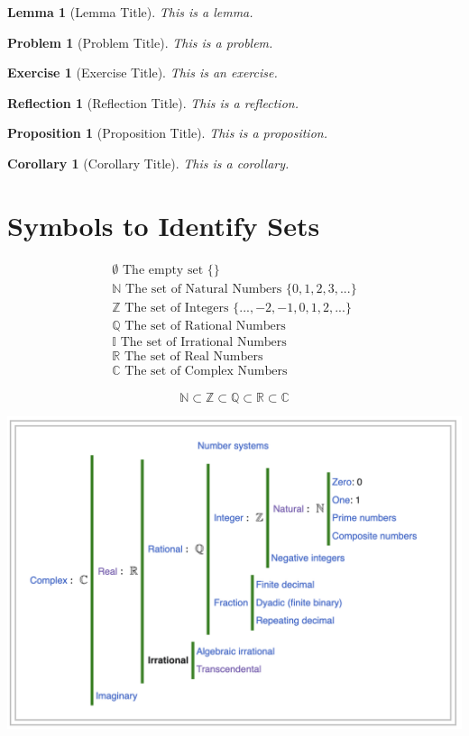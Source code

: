 \documentclass[12pt]{article}
\newtheorem{lemma}{Lemma}
\newtheorem{problem}{Problem}
\newtheorem{exercise}{Exercise}
\newtheorem{reflection}{Reflection}
\newtheorem{proposition}{Proposition}
\newtheorem{corollary}{Corollary}
\newcommand{\N}{\mathbb{N}}
\newcommand{\Z}{\mathbb{Z}}
\newcommand{\R}{\mathbb{R}}
\newcommand{\Q}{\mathbb{Q}}
\newcommand{\C}{\mathbb{C}}
\newcommand{\I}{\mathbb{I}}
\begin{document}
\begin{lemma}[Lemma Title]
	This is a lemma.
\end{lemma}

\begin{problem}[Problem Title]
This is a problem.
\end{problem}

\begin{exercise}[Exercise Title]
	This is an exercise.
\end{exercise}

\begin{reflection}[Reflection Title]
	This is a reflection.
\end{reflection}

\begin{proposition}[Proposition Title]
	This is a proposition.
\end{proposition}

\begin{corollary}[Corollary Title]
	This is a corollary.
\end{corollary}

\newpage
\section{Symbols to Identify Sets}
\begin{equation}
	\begin{split}
		\emptyset \text{ The empty set } \{ \}\\
		\N \text{ The set of Natural Numbers } \{0,1,2,3, ...\}\\
		\Z \text{ The set of Integers } \{...,-2,-1,0,1,2,...\}\\
		\Q \text{ The set of Rational Numbers}\\
		\I \text{ The set of Irrational Numbers}\\
		\R \text{ The set of Real Numbers}\\
		\C \text{ The set of Complex Numbers}
	\end{split}
\end{equation}

\begin{equation}
	\N \subset \Z \subset \Q \subset \R \subset \C
\end{equation}


\includegraphics[width=\textwidth]{number_system.png}

\listoftheorems
\end{document}
